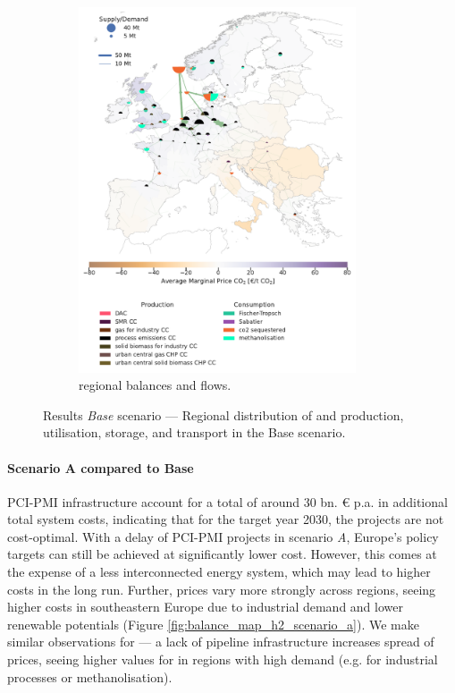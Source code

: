\documentclass[preprint,12pt]{elsarticle}
\begin{document}
\begin{figure}[htbp]
\begin{subfigure}[t]{0.47\textwidth}
      \includegraphics[width=0.9\textwidth]{balance_map_co2_base} %
      \caption{ regional balances and flows.}
      \label{fig:balance_map_co2_base}
  \end{subfigure}
  \caption{Results \textit{Base} scenario --- Regional distribution of  and  production, utilisation, storage, and transport in the Base scenario.}
  \label{fig:balance_maps_base}
\end{figure}

\paragraph{Scenario A compared to Base} PCI-PMI infrastructure account for a total of around 30 bn. \euro{} p.a. in additional total system costs, indicating that for the target year 2030, the projects are not cost-optimal. With a delay of PCI-PMI projects in scenario \textit{A}, Europe's policy targets can still be achieved at significantly lower cost. However, this comes at the expense of a less interconnected energy system, which may lead to higher costs in the long run. Further,  prices vary more strongly across regions, seeing higher costs in southeastern Europe due to industrial demand and lower renewable potentials (Figure \ref{fig:balance_map_h2_scenario_a}). We make similar observations for  --- a lack of pipeline infrastructure increases spread of  prices, seeing higher values for  in regions with high demand (e.g. for industrial processes or methanolisation). 
\end{document}
